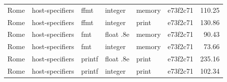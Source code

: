 {{\begin{longtable}{llllllr}
Rome & host-specifiers & ffmt & integer & memory & e73f2c71 & 110.25 \\
Rome & host-specifiers & ffmt & integer & print & e73f2c71 & 130.86 \\
Rome & host-specifiers & fmt & float .8e & memory & e73f2c71 & 90.43 \\
Rome & host-specifiers & fmt & integer & memory & e73f2c71 & 73.66 \\
Rome & host-specifiers & printf & float .8e & print & e73f2c71 & 235.16 \\
Rome & host-specifiers & printf & integer & print & e73f2c71 & 102.34 \\
\bottomrule
\end{longtable}
}}
\newcommand{\coveragetable}{%
\begin{tabular}{lrrr}
\toprule
Metric & Covered & Instrumented & Percent \\
\midrule
Regions & 3244 & 3519 & 92.19 \\
Executable lines & 3445 & 3740 & 92.11 \\
Branch edges & 2119 & 2540 & 83.43 \\
\bottomrule
\end{tabular}
}
\newcommand{\resourcetable}{%
{\small
\begin{longtable}{llrlrrr}
\toprule
GPU target & Route & Stage & Sink & Calls & Regs/VGPR & Frame/scratch B \\
\midrule
\endhead
gfx942 & hip & 128 & memory & 1 & 97 & 1440 \\
gfx942 & hip & 128 & memory & 2 & 64 & 1520 \\
gfx942 & hip & 128 & print & 1 & 124 & 1600 \\
gfx942 & hip & 128 & print & 2 & 64 & 1744 \\
gfx942 & hip & 512 & memory & 1 & 97 & 1440 \\
gfx942 & hip & 512 & memory & 2 & 64 & 1520 \\
gfx942 & hip & 512 & print & 1 & 124 & 1984 \\
gfx942 & hip & 512 & print & 2 & 64 & 2128 \\
sm\_86 & nvcc & 128 & memory & 1 & 120 & 1392 \\
sm\_86 & nvcc & 128 & memory & 2 & 120 & 1400 \\
sm\_86 & nvcc & 128 & print & 1 & 70 & 1568 \\
sm\_86 & nvcc & 128 & print & 2 & 103 & 1664 \\
sm\_86 & nvcc & 512 & memory & 1 & 120 & 1392 \\
sm\_86 & nvcc & 512 & memory & 2 & 120 & 1400 \\
sm\_86 & nvcc & 512 & print & 1 & 70 & 1952 \\
sm\_86 & nvcc & 512 & print & 2 & 104 & 2432 \\
\bottomrule
\end{longtable}
}}
\newcommand{\measuredgroups}{768}
